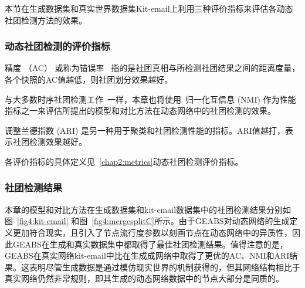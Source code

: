 

本节在生成数据集和真实世界数据集Kit-email上利用三种评价指标来评估各动态社团检测方法的效果。



\subsubsection{动态社团检测的评价指标}
{精度} （AC） 或称为错误率~\cite{lin2009analyzing} 指的是社团真相与所检测社团结果之间的距离度量，各个快照的AC值越低，则社团划分效果越好。

与大多数时序社团检测工作~\cite{hartmann2016clustering}一样，本章也将使用~{归一化互信息} (NMI) 作为性能指标之一来评估所提出的模型和对比方法在动态网络中的社团检测的效果。

{调整兰德指数} (ARI) 是另一种用于聚类和社团检测性能的指标。ARI值越打，表示社团检测效果越好。

各评价指标的具体定义见~\ref{chap2:metrics}动态社团检测评价指标。

\subsubsection{社团检测结果}

本章的模型和对比方法在生成数据集和kit-email数据集中的社团检测结果分别如图~\ref{fig4:kit-email} 和图~\ref{fig4:mergesplitC}所示。由于GEABS对动态网络的生成定义更加符合现实，且引入了节点流行度参数以刻画节点在动态网络中的异质性，因此GEABS在生成和真实数据集中都取得了最佳社团检测结果。值得注意的是，GEABS在真实网络kit-email中比在生成成网络中取得了更优的AC、NMI和ARI结果。这表明尽管生成数据是通过模仿现实世界的机制获得的，但其网络结构相比于真实网络仍然非常规则，即其生成的动态网络数据中的节点大部分是同质的。


